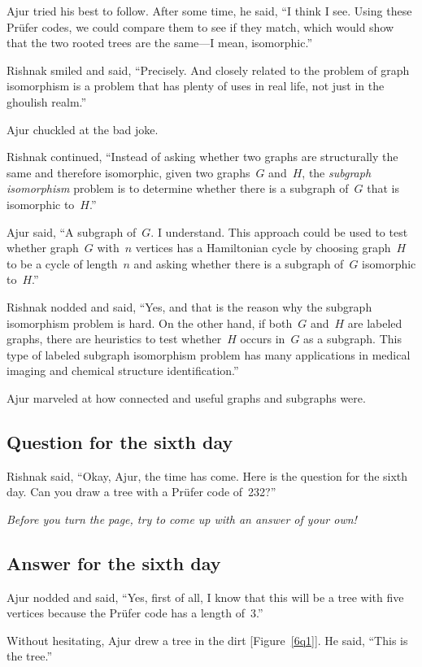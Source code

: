 Ajur tried his best to follow. After some time, he said, ``I think I see. Using these Pr\"ufer codes, we could compare them to see if they match, which would show that the two rooted trees are the same---I mean, isomorphic.''

Rishnak smiled and said, ``Precisely. And closely related to the problem of graph isomorphism is a problem that has plenty of uses in real life, not just in the ghoulish realm.''

Ajur chuckled at the bad joke.

Rishnak continued, ``Instead of asking whether two graphs are structurally the same and therefore isomorphic, given two graphs~$G$ and~$H$, the \textit{subgraph isomorphism} problem is to determine whether there is a subgraph of~$G$ that is isomorphic to~$H$.''

Ajur said, ``A subgraph of~$G$. I understand. This approach could be used to test whether graph~$G$ with~$n$ vertices has a Hamiltonian cycle by choosing graph~$H$ to be a cycle of length~$n$ and asking whether there is a subgraph of~$G$ isomorphic to~$H$.''

Rishnak nodded and said, ``Yes, and that is the reason why the subgraph isomorphism problem is hard. On the other hand, if both~$G$ and~$H$ are labeled graphs, there are heuristics to test whether~$H$ occurs in~$G$ as a subgraph. This type of labeled subgraph isomorphism problem has many applications in medical imaging and chemical structure identification.''

Ajur marveled at how connected and useful graphs and subgraphs were.

\subsection*{Question for the sixth day}
Rishnak said, ``Okay, Ajur, the time has come. Here is the question for the sixth day. Can you draw a tree with a Pr{\"u}fer code of~232?''

\textit{Before you turn the page, try to come up with an answer of your own!}

\newpage
\subsection*{Answer for the sixth day}
Ajur nodded and said, ``Yes, first of all, I know that this will be a tree with five vertices because the Pr\"ufer code has a length of~3.''

Without hesitating, Ajur drew a tree in the dirt [Figure~\ref{6q1}].  He said, ``This is the tree.''


